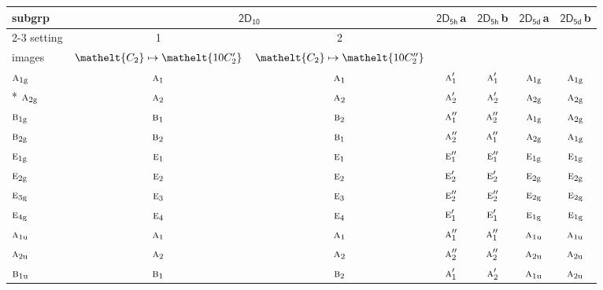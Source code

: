 \documentclass[10pt,a4paper]{article}
\numberwithin{equation}{section}
\newcommand{\eltfont}[1]{{\let\sigma\eltsigma\mathelt{#1}}}
\newcommand{\grp}[1]{\mathsf{#1}}
\newcommand{\irr}[1]{\text{\normalfont\scshape #1}}
\newcommand{\cls}[1]{\eltfont{#1}}
\newcommand{\ptag}[1]{\mathrm{#1}}
\newcommand{\clsletter}[1]{\,{\scriptsize\color{black!55}#1}}
\begin{document}
{\small\begin{longtable}{@{}lcccccc@{}}\toprule
subgrp & \multicolumn{2}{c}{\href{2D10.pdf}{$\grp{2D_{10}}$}} & \href{2D5h.pdf}{$\grp{2D_{5h}}$}\clsletter{a} & \href{2D5h.pdf}{$\grp{2D_{5h}}$}\clsletter{b} & \href{2D5d.pdf}{$\grp{2D_{5d}}$}\clsletter{a} & \href{2D5d.pdf}{$\grp{2D_{5d}}$}\clsletter{b}\\\cmidrule(lr){2-3}
setting & 1 & 2 &  &  &  & \\
images & {\scriptsize $\cls{C_{2}} \mapsto \cls{10C_{2}'}$} & {\scriptsize $\cls{C_{2}} \mapsto \cls{10C_{2}''}$} &  &  &  & \\\midrule\endhead
\bottomrule\endfoot\endlastfoot
$\irr{a}_{1\ptag{g}}$ & $\irr{a}_{1}$ & $\irr{a}_{1}$ & $\irr{a}_{1}'$ & $\irr{a}_{1}'$ & $\irr{a}_{1\ptag{g}}$ & $\irr{a}_{1\ptag{g}}$\\*
$\irr{a}_{2\ptag{g}}$ & $\irr{a}_{2}$ & $\irr{a}_{2}$ & $\irr{a}_{2}'$ & $\irr{a}_{2}'$ & $\irr{a}_{2\ptag{g}}$ & $\irr{a}_{2\ptag{g}}$\\
$\irr{b}_{1\ptag{g}}$ & $\irr{b}_{1}$ & $\irr{b}_{2}$ & $\irr{a}_{1}''$ & $\irr{a}_{2}''$ & $\irr{a}_{1\ptag{g}}$ & $\irr{a}_{2\ptag{g}}$\\
$\irr{b}_{2\ptag{g}}$ & $\irr{b}_{2}$ & $\irr{b}_{1}$ & $\irr{a}_{2}''$ & $\irr{a}_{1}''$ & $\irr{a}_{2\ptag{g}}$ & $\irr{a}_{1\ptag{g}}$\\
$\irr{e}_{1\ptag{g}}$ & $\irr{e}_{1}$ & $\irr{e}_{1}$ & $\irr{e}_{1}''$ & $\irr{e}_{1}''$ & $\irr{e}_{1\ptag{g}}$ & $\irr{e}_{1\ptag{g}}$\\
$\irr{e}_{2\ptag{g}}$ & $\irr{e}_{2}$ & $\irr{e}_{2}$ & $\irr{e}_{2}'$ & $\irr{e}_{2}'$ & $\irr{e}_{2\ptag{g}}$ & $\irr{e}_{2\ptag{g}}$\\
$\irr{e}_{3\ptag{g}}$ & $\irr{e}_{3}$ & $\irr{e}_{3}$ & $\irr{e}_{2}''$ & $\irr{e}_{2}''$ & $\irr{e}_{2\ptag{g}}$ & $\irr{e}_{2\ptag{g}}$\\
$\irr{e}_{4\ptag{g}}$ & $\irr{e}_{4}$ & $\irr{e}_{4}$ & $\irr{e}_{1}'$ & $\irr{e}_{1}'$ & $\irr{e}_{1\ptag{g}}$ & $\irr{e}_{1\ptag{g}}$\\
$\irr{a}_{1\ptag{u}}$ & $\irr{a}_{1}$ & $\irr{a}_{1}$ & $\irr{a}_{1}''$ & $\irr{a}_{1}''$ & $\irr{a}_{1\ptag{u}}$ & $\irr{a}_{1\ptag{u}}$\\
$\irr{a}_{2\ptag{u}}$ & $\irr{a}_{2}$ & $\irr{a}_{2}$ & $\irr{a}_{2}''$ & $\irr{a}_{2}''$ & $\irr{a}_{2\ptag{u}}$ & $\irr{a}_{2\ptag{u}}$\\
$\irr{b}_{1\ptag{u}}$ & $\irr{b}_{1}$ & $\irr{b}_{2}$ & $\irr{a}_{1}'$ & $\irr{a}_{2}'$ & $\irr{a}_{1\ptag{u}}$ & $\irr{a}_{2\ptag{u}}$\\

\end{longtable}}
\end{document}
